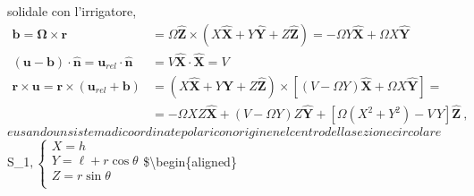 \documentclass[letterpaper,10pt,italian]{jupyterBook}
\begin{document}
solidale con l'irrigatore, \)\(\begin{aligned}
 \bm{b} = \bm{\Omega} \times \bm{r} & = \Omega \bm{\hat{Z}} \times \left( X \bm{\hat{X}} + Y \bm{\hat{Y}} + Z \bm{\hat{Z}}  \right) = -\Omega Y \bm{\hat{X}} + \Omega X \bm{\hat{Y}} \\
 \left( \bm{u} - \bm{b} \right) \cdot \bm{\hat{n}} = \bm{u}_{rel} \cdot \bm{\hat{n}} & =  V \bm{\hat{X}} \cdot \bm{\hat{X}} = V \\
 \bm{r} \times \bm{u} = \bm{r} \times (\bm{u}_{rel} + \bm{b} ) & = \left( X \bm{\hat{X}} + Y \bm{\hat{Y}} + Z \bm{\hat{Z}} \right) \times \left[ \left(V-\Omega Y\right)\bm{\hat{X}} + \Omega X \bm{\hat{Y}} \right] = \\
  & = - \Omega X Z \bm{\hat{X}} + \left( V - \Omega Y \right) Z \bm{\hat{Y}} + 
  \left[ \Omega \left( X^2 + Y^2 \right) - V \, Y \right] \bm{\hat{Z}} \ , 
\end{aligned}\)\( e usando un sistema di coordinate polari con origine nel
centro della sezione circolare \)S\_1\(, \)\(\begin{cases}
 X = h \\
 Y = \ell + r \cos\theta \\
 Z = r \sin\theta \\
\end{cases}\)\( \)\$\textbackslash{}begin\{aligned\}
\end{document}
